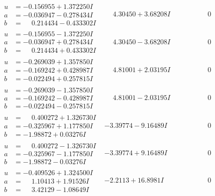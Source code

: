 \documentclass[1p]{elsarticle_modified}
\theoremstyle{definition}
\begin{document}
$$\begin{array}{c|c|c}
\begin{aligned}
u &= -0.156955 + 1.372250 I \\
a &= -0.036947 - 0.278434 I \\
b &= \phantom{-}0.214434 - 0.433302 I\end{aligned}
 & \phantom{-}4.30450 + 3.68208 I & \phantom{-0.000000 } 0 \\ \hline\begin{aligned}
u &= -0.156955 - 1.372250 I \\
a &= -0.036947 + 0.278434 I \\
b &= \phantom{-}0.214434 + 0.433302 I\end{aligned}
 & \phantom{-}4.30450 - 3.68208 I & \phantom{-0.000000 } 0 \\ \hline\begin{aligned}
u &= -0.269039 + 1.357850 I \\
a &= -0.169242 + 0.428987 I \\
b &= -0.022494 + 0.257815 I\end{aligned}
 & \phantom{-}4.81001 + 2.03195 I & \phantom{-0.000000 } 0 \\ \hline\begin{aligned}
u &= -0.269039 - 1.357850 I \\
a &= -0.169242 - 0.428987 I \\
b &= -0.022494 - 0.257815 I\end{aligned}
 & \phantom{-}4.81001 - 2.03195 I & \phantom{-0.000000 } 0 \\ \hline\begin{aligned}
u &= \phantom{-}0.400272 + 1.326730 I \\
a &= -0.325967 + 1.177850 I \\
b &= -1.98872 + 0.03276 I\end{aligned}
 & -3.39774 - 9.16489 I & \phantom{-0.000000 } 0 \\ \hline\begin{aligned}
u &= \phantom{-}0.400272 - 1.326730 I \\
a &= -0.325967 - 1.177850 I \\
b &= -1.98872 - 0.03276 I\end{aligned}
 & -3.39774 + 9.16489 I & \phantom{-0.000000 } 0 \\ \hline\begin{aligned}
u &= -0.409526 + 1.324500 I \\
a &= \phantom{-}1.10413 + 1.91526 I \\
b &= \phantom{-}3.42129 - 1.08649 I\end{aligned}
 & -2.2113 + 16.8981 I & \phantom{-0.000000 } 0\\

\end{array}$$
\end{document}
